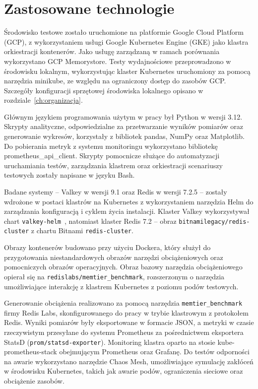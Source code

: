 \section{Zastosowane technologie}

Środowisko testowe zostało uruchomione na platformie Google Cloud Platform (GCP), z wykorzystaniem usługi Google Kubernetes Engine (GKE) jako klastra orkiestracji kontenerów. Jako usługę zarządzaną w ramach porównania wykorzystano GCP Memorystore. Testy wydajnościowe przeprowadzono w środowisku lokalnym, wykorzystując klaster Kubernetes uruchomiony za pomocą narzędzia minikube, ze względu na ograniczony dostęp do zasobów GCP. Szczegóły konfiguracji sprzętowej środowiska lokalnego opisano w rozdziale~\ref{ch:organizacja}.

Głównym językiem programowania użytym w pracy był Python w wersji 3.12. Skrypty analityczne, odpowiedzialne za przetwarzanie wyników pomiarów oraz generowanie wykresów, korzystały z bibliotek pandas, NumPy oraz Matplotlib. Do pobierania metryk z systemu monitoringu wykorzystano bibliotekę prometheus\_api\_client. Skrypty pomocnicze służące do automatyzacji uruchamiania testów, zarządzania klastrem oraz orkiestracji scenariuszy testowych zostały napisane w języku Bash.

Badane systemy -- Valkey w wersji 9.1 oraz Redis w wersji 7.2.5 -- zostały wdrożone w postaci klastrów na Kubernetes z wykorzystaniem narzędzia Helm do zarządzania konfiguracją i cyklem życia instalacji. Klaster Valkey wykorzystywał chart \texttt{valkey-helm}~\cite{valkeyHelmPr116}, natomiast klaster Redis 7.2 -- obraz \texttt{bitnamilegacy/redis-cluster} z chartu Bitnami \texttt{redis-cluster}.

Obrazy kontenerów budowano przy użyciu Dockera, który służył do przygotowania niestandardowych obrazów narzędzi obciążeniowych oraz pomocniczych obrazów operacyjnych. Obraz bazowy narzędzia obciążeniowego opierał się na \texttt{redislabs/memtier\_benchmark}, rozszerzonym o narzędzia umożliwiające interakcję z klastrem Kubernetes z poziomu podów testowych.

Generowanie obciążenia realizowano za pomocą narzędzia \texttt{memtier\_benchmark} firmy Redis Labs, skonfigurowanego do pracy w trybie klastrowym z protokołem Redis. Wyniki pomiarów były eksportowane w formacie JSON, a metryki w czasie rzeczywistym przesyłane do systemu Prometheus za pośrednictwem eksportera StatsD (\texttt{prom/statsd-exporter}). Monitoring klastra oparto na stosie kube-prometheus-stack obejmującym Prometheus oraz Grafanę. Do testów odporności na awarie wykorzystano narzędzie Chaos Mesh, umożliwiające symulację zakłóceń w środowisku Kubernetes, takich jak awarie podów, ograniczenia sieciowe oraz obciążenie zasobów.

